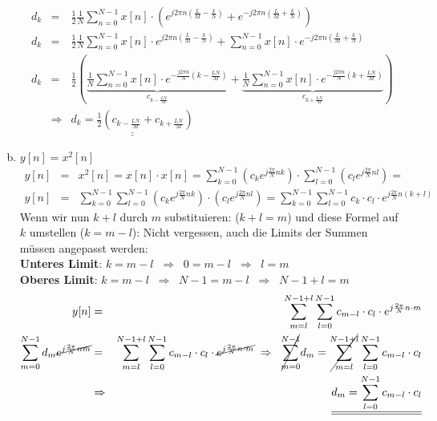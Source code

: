 \begin{uebsp}
\begin{Answer}
\begin{enumerate}[a)]
\begin{eqnarray*}
                d_k&=&\frac{1}{2}\frac{1}{N}\sum_{n=0}^{N-1}x[n]\cdot\left(e^{j2\pi n(\frac{L}{M}-\frac{k}{N})}+e^{-j2\pi n(\frac{L}{M}+\frac{k}{N})}\right)\\
            d_k&=&\frac{1}{2}\frac{1}{N}\sum_{n=0}^{N-1}x[n]\cdot e^{j2\pi n(\frac{L}{M}-\frac{k}{N})}+\sum_{n=0}^{N-1}x[n]\cdot e^{-j2\pi n(\frac{L}{M}+\frac{k}{N})}\\
                d_k&=&\frac{1}{2}\left(\underbrace{\frac{1}{N}\sum_{n=0}^{N-1}x[n]\cdot e^{-\frac{j2\pi n}{N}(k-\frac{LN}{M})}}_{c_{k-\frac{LN}{M}}}+\underbrace{\frac{1}{N}\sum_{n=0}^{N-1}x[n]\cdot e^{-\frac{j2\pi n}{N}(k+\frac{LN}{M})}}_{c_{k+\frac{LN}{M}}}\right)\\
                   &\Rightarrow & \underline{\underline{d_k=\frac{1}{2}\left({c_{k-\frac{LN}{M}}}+{c_{k+\frac{LN}{M}}}\right)}}
            \end{eqnarray*}
        \item $y[n]=x^2[n]$
            \begin{eqnarray*}
                y[n]&=&x^2[n]=x[n]\cdot x[n]= \sum_{k=0}^{N-1}\left(c_ke^{j\frac{2\pi}{N}nk}\right)\cdot \sum_{l=0}^{N-1}\left(c_le^{j\frac{2\pi}{N}nl}\right)=\\
                y[n]&=& \sum_{k=0}^{N-1}\sum_{l=0}^{N-1}\left(c_ke^{j\frac{2\pi}{N}nk}\right)\cdot \left(c_le^{j\frac{2\pi}{N}nl}\right)=\sum_{k=0}^{N-1}\sum_{l=0}^{N-1}c_k\cdot c_l\cdot e^{j\frac{2\pi}{N}n(k+l)}
            \end{eqnarray*}
            Wenn wir nun $k+l$ durch $m$ substituieren: ($k+l=m$) und diese Formel auf $k$ umstellen ($k=m-l$):
            Nicht vergessen, auch die Limits der Summen müssen angepasst werden:\\

            \textbf{Unteres Limit}: $k=m-l\;\;\Rightarrow\;\;0=m-l\;\;\Rightarrow\;\;l=m$\\
            \textbf{Oberes Limit}: $k=m-l\;\;\Rightarrow\;\;N-1=m-l\;\;\Rightarrow\;\;N-1+l=m$
            \begin{eqnarray*}
                y[n]&=& \sum_{m=l}^{N-1+l}\sum_{l=0}^{N-1}c_{m-l}\cdot c_l\cdot e^{j\frac{2\pi}{N}n\cdot m}\\
                \sum_{m=0}^{N-1}d_m\cancel{e^{j\frac{2\pi}{N}nm}}&=& \sum_{m=l}^{N-1+l}\sum_{l=0}^{N-1}c_{m-l}\cdot c_l\cdot \cancel{e^{j\frac{2\pi}{N}n\cdot m}}\;\Rightarrow\;\;
                \cancel{\sum_{m=0}^{N-1}}d_m= \cancel{\sum_{m=l}^{N-1+l}}\sum_{l=0}^{N-1}c_{m-l}\cdot c_l\\
                &\Rightarrow& \underline{\underline{d_m=\sum_{l=0}^{N-1}c_{m-l}\cdot c_l}}
            \end{eqnarray*}
    \end{enumerate}
\end{Answer}
\end{uebsp}
